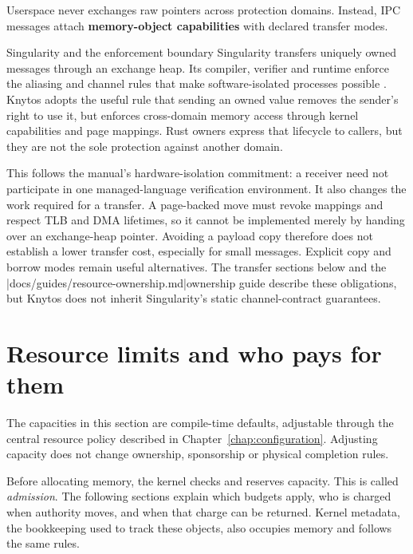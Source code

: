 Userspace never exchanges raw pointers across protection domains. Instead, IPC
messages attach \textbf{memory-object capabilities} with declared transfer modes.

\begin{architecturalcomparison}{Singularity and the enforcement boundary}
Singularity transfers uniquely owned messages through an exchange heap.
Its compiler, verifier and runtime enforce the aliasing and channel rules
that make software-isolated processes possible \cite{prior:singularity}.
Knytos adopts the useful rule that sending an owned value removes the
sender's right to use it, but enforces cross-domain memory access through
kernel capabilities and page mappings. Rust owners express that lifecycle
to callers, but they are not the sole protection against another domain.

This follows the manual's hardware-isolation commitment: a receiver need not
participate in one managed-language verification environment. It also changes
the work required for a transfer. A page-backed move must revoke mappings and
respect TLB and DMA lifetimes, so it cannot be implemented merely by handing over
an exchange-heap pointer. Avoiding a payload copy therefore does not establish
a lower transfer cost, especially for small messages. Explicit copy and borrow
modes remain useful alternatives. The transfer sections below and the
\repofiletext|docs/guides/resource-ownership.md|{ownership guide} describe
these obligations, but Knytos does not inherit Singularity's static
channel-contract guarantees.
\end{architecturalcomparison}

\section{Resource limits and who pays for them}

The capacities in this section are compile-time defaults, adjustable through the
central resource policy described in Chapter~\ref{chap:configuration}. Adjusting
capacity does not change ownership, sponsorship or physical completion rules.

Before allocating memory, the kernel checks and reserves capacity. This is
called \emph{admission}. The following sections explain which budgets apply,
who is charged when authority moves, and when that charge can be returned.
Kernel metadata, the bookkeeping used to track these objects, also occupies
memory and follows the same rules.

